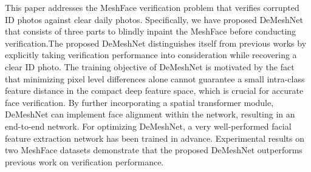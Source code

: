\documentclass[10pt,twocolumn,letterpaper]{article}
\begin{document}
This paper addresses the MeshFace verification problem that verifies corrupted ID photos against clear daily photos. Specifically, we have proposed DeMeshNet that consists of three parts to blindly inpaint the MeshFace before conducting verification.The proposed DeMeshNet distinguishes itself from previous works by explicitly taking verification performance into consideration while recovering a clear ID photo. The training objective of DeMeshNet is motivated by the fact that minimizing pixel level differences alone cannot guarantee a small intra-class feature distance in the compact deep feature space, which is crucial for accurate face verification. By further incorporating a spatial transformer module, DeMeshNet can implement face alignment within the network, resulting in an end-to-end network. For optimizing DeMeshNet, a very well-performed facial feature extraction network has been trained in advance. Experimental results on two MeshFace datasets demonstrate that the proposed DeMeshNet outperforms previous work on verification performance.




{\small


}
\end{document}

